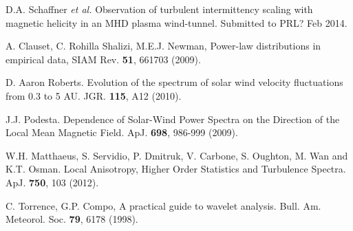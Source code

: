 \documentclass[aip,prl,amsmath,amssymb,reprint,superscriptaddress]{revtex4-1} %
\begin{document}
\begin{thebibliography}{99}
 D.A. Schaffner {\it et al.} Observation of turbulent intermittency scaling with magnetic helicity in an MHD plasma wind-tunnel. Submitted to PRL? Feb 2014.

A. Clauset, C. Rohilla Shalizi, M.E.J. Newman, Power-law distributions in empirical data, SIAM Rev. {\bf 51}, 661703 (2009).

D. Aaron Roberts. Evolution of the spectrum of solar wind velocity fluctuations from 0.3 to 5 AU. JGR. {\bf 115}, A12 (2010).

J.J. Podesta. Dependence of Solar-Wind Power Spectra on the Direction of the Local Mean Magnetic Field. ApJ. {\bf 698}, 986-999 (2009).

W.H. Matthaeus, S. Servidio, P. Dmitruk, V. Carbone, S. Oughton, M. Wan and K.T. Osman. Local Anisotropy, Higher Order Statistics and Turbulence Spectra. ApJ. {\bf 750}, 103 (2012).

C. Torrence, G.P. Compo, A practical guide to wavelet analysis. Bull. Am. Meteorol. Soc. {\bf 79}, 6178 (1998).










\end{thebibliography}
\end{document}

